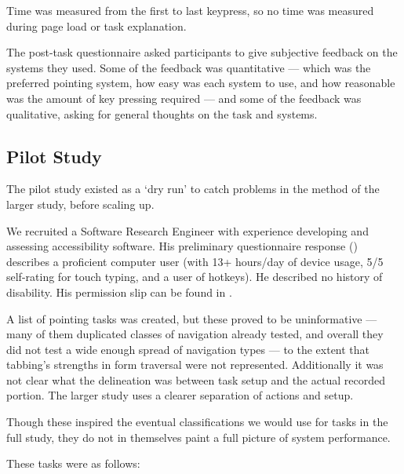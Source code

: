 \documentclass[11pt,openright,a4paper]{report}
\begin{document}
Time was measured from the first to last keypress, so no time was measured during page load or task explanation.

The post-task questionnaire asked participants to give subjective feedback on the systems they used. Some of the feedback was quantitative --- which was the preferred pointing system, how easy was each system to use, and how reasonable was the amount of key pressing required --- and some of the feedback was qualitative, asking for general thoughts on the task and systems.

\subsection{Pilot Study}
The pilot study existed as a `dry run' to catch problems in the method of the larger study, before scaling up.

We recruited a Software Research Engineer with experience developing and assessing accessibility software. His preliminary questionnaire response () describes a proficient computer user (with 13+ hours/day of device usage, 5/5 self-rating for touch typing, and a user of hotkeys). He described no history of disability. His permission slip can be found in .

A list of pointing tasks was created, but these proved to be uninformative --- many of them duplicated classes of navigation already tested, and overall they did not test a wide enough spread of navigation types --- to the extent that tabbing's strengths in form traversal were not represented. Additionally it was not clear what the delineation was between task setup and the actual recorded portion. The larger study uses a clearer separation of actions and setup.

Though these inspired the eventual classifications we would use for tasks in the full study, they do not in themselves paint a full picture of system performance.

These tasks were as follows:
\end{document}
